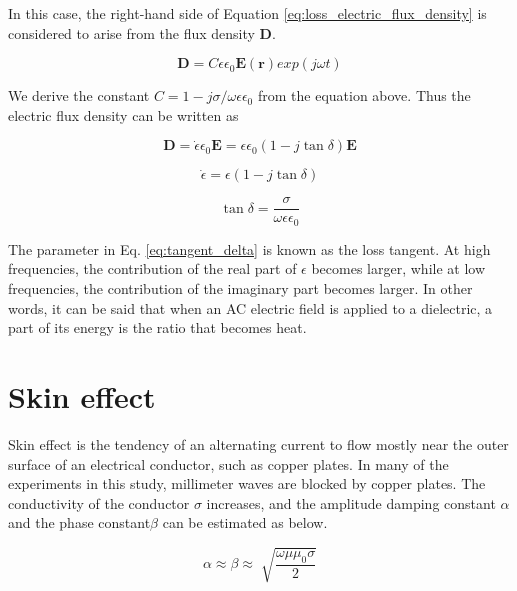 \documentclass[a4paper,12pt]{report}
\begin{document}
In this case, the right-hand side of Equation \ref{eq:loss_electric_flux_density}
is considered to arise from the flux density $\boldsymbol{D}$.

\begin{equation} \label{eq:electric_flux_density}
  \boldsymbol{D} = C\epsilon \epsilon_0 \boldsymbol{E}(\boldsymbol{r})exp(j\omega t)
\end{equation}

We derive the constant $C=1 - j\sigma / \omega\epsilon\epsilon_0$ from the equation above.
Thus the electric flux density can be written as

\begin{equation} \label{eq:electric_flux_density_tangent_delta}
  \boldsymbol{D} = \dot{\epsilon} \epsilon_0 \boldsymbol{E} = \epsilon \epsilon_0 (1 - j\tan\delta)\boldsymbol{E}
\end{equation}

\begin{equation} \label{eq:epsilon_dot}
  \dot{\epsilon} = \epsilon (1 - j\tan\delta)
\end{equation}

\begin{equation} \label{eq:tangent_delta}
  \tan \delta = \frac{\sigma}{\omega\epsilon\epsilon_0}
\end{equation}

The parameter in Eq. \ref{eq:tangent_delta} is known as the loss tangent.
At high frequencies, the contribution of the real part of $\epsilon$ becomes larger,
while at low frequencies, the contribution of the imaginary part becomes larger.
In other words, it can be said that when an AC electric field is applied to a dielectric,
a part of its energy is the ratio that becomes heat.

\section{Skin effect}

Skin effect is the tendency of an alternating current to flow mostly near
the outer surface of an electrical conductor, such as copper plates.
In many of the experiments in this study, 
millimeter waves are blocked by copper plates.
The conductivity of the conductor $\sigma$ increases,
and the amplitude damping constant $\alpha$ and the phase constant$\beta$
can be estimated as below.

\begin{equation}
  \alpha \approx \beta \approx \sqrt[]{\frac{\omega\mu\mu_0\sigma}{2}}
\end{equation}
\end{document}
